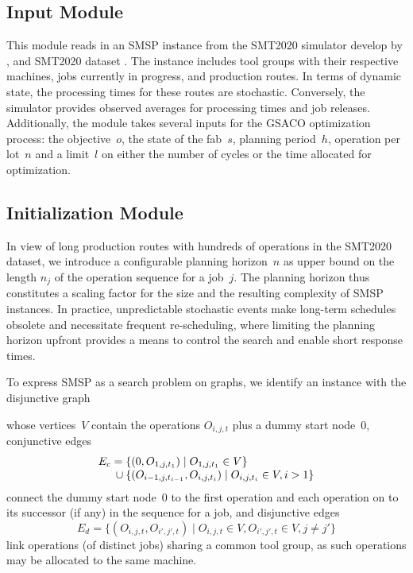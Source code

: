 \subsection{Input Module}
This module reads in an SMSP instance from the SMT2020 simulator develop by \cite{Kovács2022}, 
and SMT2020 dataset \cite{kopp2020smt2020}.
The instance includes tool groups with their respective machines, jobs currently in progress, and production routes. In terms of dynamic state, the processing times for these routes are stochastic. Conversely, the simulator provides observed averages for processing times and job releases. Additionally, the module takes several inputs for the GSACO optimization process: the objective~$o$, the state of the fab~$s$, planning period~$h$, 
operation per lot~$n$ and a limit~$l$ on either the number of cycles or the time allocated for optimization.


\subsection{Initialization Module}
\label{subsec:initialization}
In view of long production routes with hundreds of operations
in the SMT2020 dataset, we introduce a configurable planning horizon~$n$
as upper bound on the length $n_j$ of the operation sequence for a job~$j$.
The planning horizon thus constitutes a scaling factor for the size and
the resulting complexity of SMSP instances.
In practice, unpredictable stochastic events make long-term schedules obsolete and necessitate frequent re-scheduling,
where limiting the planning horizon upfront provides a means to
control the search and enable short response times.

To express SMSP as a search problem on graphs,
we identify an instance with the disjunctive graph

whose vertices~$V$ contain the operations $O_{i,j,t}$ plus
a dummy start node~$0$,
conjunctive edges\linebreak[1]%
%
\begin{equation}
	\begin{array}{@{}r@{}l@{}}
		E_c = {}
		& \{(0,O_{1,j,t_1}) \mid O_{1,j,t_1}\in V\}
		\\ {} \cup {}
		& \{(O_{i-1,j,t_{i-1}},O_{i,j,t_i}) \mid O_{i,j,t_i}\in V, i > 1\}
	\end{array}
\end{equation}
%
connect the dummy start node~$0$ to the first operation
and each operation on to its successor (if any) in the sequence for a job,
and disjunctive edges\linebreak[1]%
%
\begin{equation}
	E_d = \{(O_{i,j,t},O_{i',j',t}) \mid O_{i,j,t}\in V,O_{i',j',t}\in V, j\neq j'\}
\end{equation}
%
link operations (of distinct jobs) sharing a common tool group,
as such operations may be allocated to the same machine.

